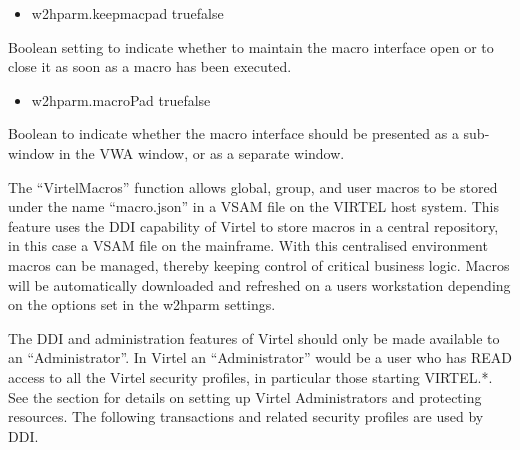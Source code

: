 \documentclass[letterpaper,10pt,english]{sphinxmanual}
\begin{document}
 
\begin{itemize}
\item {} 
w2hparm.keepmacpad true\textbar{}false

\end{itemize}

Boolean setting to indicate whether to maintain the macro interface open or to close it as soon as a macro has been executed.
\begin{itemize}
\item {} 
w2hparm.macroPad true\textbar{}false

\end{itemize}

Boolean to indicate whether the macro interface should be presented as a sub-window in the VWA window, or as a separate window.


The “VirtelMacros” function allows global, group, and user macros to be stored under the name “macro.json” in a
VSAM file on the VIRTEL host system. This feature uses the DDI capability of Virtel to store macros in a central repository, in this case a VSAM file on the mainframe. With this centralised environment macros can be managed, thereby keeping control of critical business logic. Macros will be automatically downloaded and refreshed on a users workstation depending on the options set in the w2hparm settings.

The DDI and administration features of Virtel should only be made available to an “Administrator”. In Virtel an “Administrator” would be a user who has READ access to all the Virtel security profiles, in particular those starting VIRTEL.*. See the section  for details on setting up Virtel Administrators and protecting resources. The following transactions and related security profiles are used by DDI.
\end{document}

